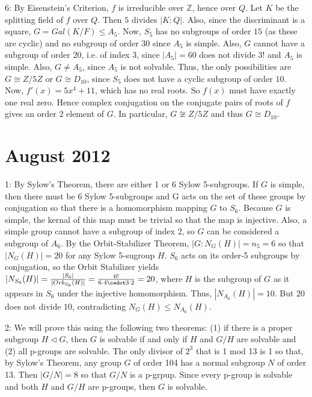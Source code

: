 \documentclass[12pt]{article}
\newcommand{\Z}{\mathbb{Z}}
\begin{document}
6: By Eisenstein's Criterion, $f$ is irreducible over $\Z$, hence over $Q$. Let $K$ be the splitting field of $f$ over $Q$. Then $5$ divides $|K:Q|$. Also, since the discriminant is a square, $G=Gal(K/F)\le A_5$. Now, $S_5$ has no subgroups of order $15$ (as these are cyclic) and no subgroup of order $30$ since $A_5$ is simple. Also, $G$ cannot have a subgroup of order $20$, i.e. of index $3$, since $|A_5|=60$ does not divide $3!$ and $A_5$ is simple. Also, $G\neq A_5$, since $A_5$ is not solvable. Thus, the only possibilities are $G \cong Z / 5Z$ or $G \cong D_{10}$, since $S_5$ does not have a cyclic subgroup of order $10$. Now, $f'(x)=5x^4+11$, which has no real roots. So $f(x)$ must have exactly one real zero. Hence complex conjugation on the conjugate pairs of roots of $f$ gives an order $2$ element of $G$. In particular, $G \not \cong Z/5Z$ and thus $G \cong D_{10}$.

\section{August 2012}

1: By Sylow's Theorem, there are either 1 or 6 Sylow 5-subgroups. If $G$ is simple, then there must be 6 Sylow 5-subgroups and G acts on the set of these groups by conjugation so that there is a homomorphism mapping $G$ to $S_6$. Because $G$ is simple, the kernal of this map must be trivial so that the map is injective. Also, a simple group cannot have a subgroup of index 2, so $G$ can be considered a subgroup of $A_6$. By the Orbit-Stabilizer Theorem, $|G:N_G(H)|=n_5=6$ so that $|N_G(H)|=20$ for any Sylow 5-sugroup $H$. $S_6$ acts on its order-5 subgroups by conjugation, so the Orbit Stabilizer yields $|N_{S_6}(H)|=\frac{|S_6|}{|Orb_{S_6}(H)|}=\frac{6!}{6 \cdot 4 \cedot 3 \cdot 2}=20$, where $H$ is the subgroup of $G$ as it appears in $S_6$ under the injective homomorphism. Thus, $|N_{A_6}(H)|=10$. But $20$ does not divide $10$, contradicting $N_G(H) \leq N_{A_6}(H)$. \newline

2: We will prove this using the following two theorems: (1) if there is a proper subgroup $H \triangleleft G$, then $G$ is solvable if and only if $H$ and $G/H$ are solvable and (2) all p-groups are solvable. The only divisor of $2^3$ that is 1 mod 13 is 1 so that, by Sylow's Theorem, any group $G$ of order 104 has a normal subgroup $N$ of order 13. Then $|G/N|=8$ so that $G/N$ is a p-grpup. Since every p-group is solvable and both $H$ and $G/H$ are p-groups, then $G$ is solvable. \newline
\end{document}
